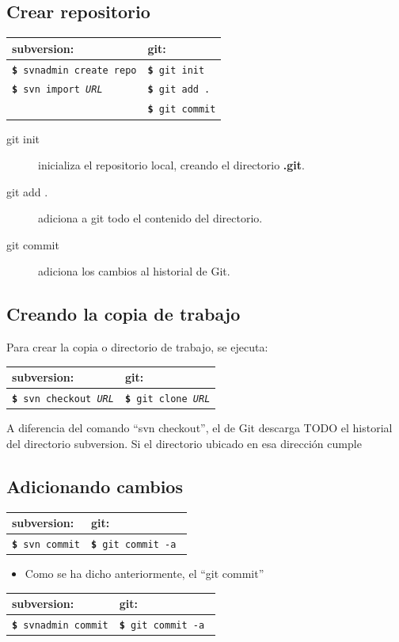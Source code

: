 \documentclass[12pt, spanish, oneside, onecolumn, a4paper]{report}
\newcommand{\svngit}[2]{%

  \begin{tabular}{| l | l |} 
    \hline subversion: & git: \\
    \hline 
    \colorbox{mygray}{\texttt{\textbf{\footnotesize\$} #1}} & \colorbox{mygray}{ \texttt{\textbf{\footnotesize\$} #2}} 
  \end{tabular}

}
\begin{document}
\subsection{Crear repositorio} 
\label{sec:createsvnrepo} 
\begin{tabular}{| l | l |} 
  \hline subversion: & git: \\
\hline 
  \colorbox{mygray}{\texttt{\textbf{\footnotesize\$} svnadmin create repo}} & \colorbox{mygray}{\texttt{\textbf{\footnotesize\$} git init}} \\
\hline 
  \colorbox{mygray}{\texttt{\textbf{\footnotesize\$} svn import \emph{URL}}} & \colorbox{mygray}{\texttt{\textbf{\footnotesize\$} git add .}}  \\
\hline & \colorbox{mygray}{\texttt{\textbf{\footnotesize\$} git commit}}\\
\hline 
\end{tabular}%
\begin{description} 
\item [git init] inicializa el repositorio local, creando el directorio 
  \textbf{ .git}. 
\item [git add .] adiciona a git todo el contenido del directorio. 
\item [git commit] adiciona los cambios al historial de Git. 
\end{description} 
\subsection{Creando la copia de trabajo}\label{sec:svnworkdir} Para crear la copia o directorio de trabajo, se ejecuta: 
\svngit{svn checkout 
  \emph{URL}}{git clone 
  \emph{URL}} A diferencia del comando ``svn checkout'', el de Git descarga TODO el historial del directorio subversion. Si el directorio ubicado en esa dirección cumple 
\subsection{Adicionando cambios} 
\label{sec:commit} 
\begin{tabular}{| l | l |} 
  \hline subversion: & git: \\
\hline 
  \colorbox{mygray}{\texttt{\textbf{\footnotesize\$} svn commit}} & \colorbox{mygray}{\texttt{\textbf{\footnotesize\$} git commit -a }} \\
\hline 
\end{tabular}

\begin{itemize} 
\item Como se ha dicho anteriormente, el ``git commit'' 
\end{itemize} 
\begin{tabular}{| l | l |} 
  \hline subversion: & git: \\
\hline 
  \colorbox{mygray}{\texttt{\textbf{\footnotesize\$} svnadmin commit}} & \colorbox{mygray}{\texttt{\textbf{\footnotesize\$} git commit -a }}  \\
\hline 
\end{tabular}%
\end{document}
